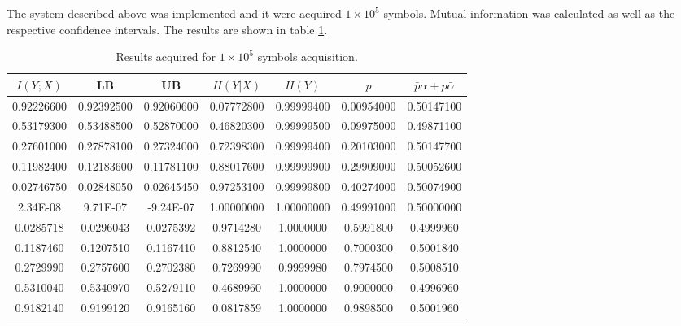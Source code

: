 \begin{refsection}
The system described above was implemented and it were acquired $1 \times 10^{5}$ symbols. Mutual information was calculated as well as the respective confidence intervals. The results are shown in table \ref{tb:data}.

\begin{table}[H]
\begin{tabular}{|c|c|c|c|c|c|c|}
\hline
$I(Y;X)$    & LB            & UB            & $H(Y|X)$      & $H(Y)$        & $p$           & $\bar{p}\alpha + p \bar{\alpha}$ \\ \hline
0.92226600  & 0.92392500    & 0.92060600    & 0.07772800    & 0.99999400    & 0.00954000    & 0.50147100                       \\ \hline
0.53179300  & 0.53488500    & 0.52870000    & 0.46820300    & 0.99999500    & 0.09975000    & 0.49871100                       \\ \hline
0.27601000  & 0.27878100    & 0.27324000    & 0.72398300    & 0.99999400    & 0.20103000    & 0.50147700                       \\ \hline
0.11982400  & 0.12183600    & 0.11781100    & 0.88017600    & 0.99999900    & 0.29909000    & 0.50052600                       \\ \hline
0.02746750  & 0.02848050    & 0.02645450    & 0.97253100    & 0.99999800    & 0.40274000    & 0.50074900                       \\ \hline
2.34E-08    & 9.71E-07      & -9.24E-07	    & 1.00000000    & 1.00000000    & 0.49991000    & 0.50000000	                   \\ \hline
0.0285718   & 0.0296043     & 0.0275392     & 0.9714280     & 1.0000000     & 0.5991800     & 0.4999960                        \\ \hline
0.1187460   & 0.1207510     & 0.1167410     & 0.8812540     & 1.0000000     & 0.7000300     & 0.5001840                        \\ \hline
0.2729990   & 0.2757600     & 0.2702380     & 0.7269990     & 0.9999980     & 0.7974500     & 0.5008510                        \\ \hline
0.5310040   & 0.5340970     & 0.5279110     & 0.4689960     & 1.0000000     & 0.9000000     & 0.4996960                        \\ \hline
0.9182140   & 0.9199120     & 0.9165160     & 0.0817859     & 1.0000000     & 0.9898500     & 0.5001960                        \\ \hline
\end{tabular}
\caption{Results acquired for $1 \times 10^{5}$ symbols acquisition.}
\label{tb:data}
\end{table}


\end{refsection}
